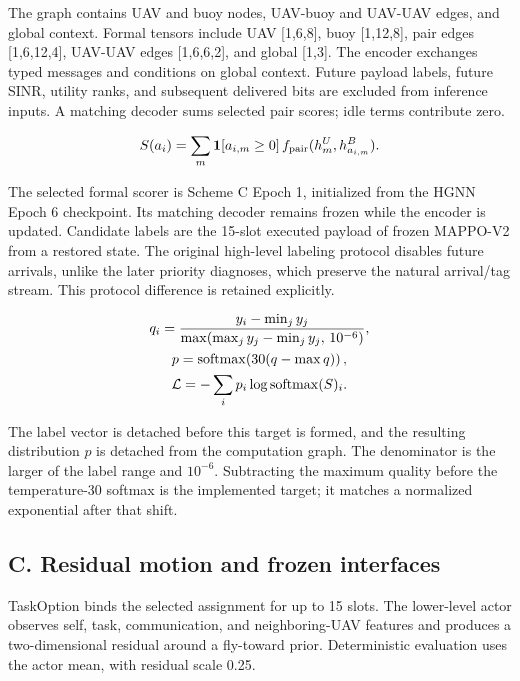 The graph contains UAV and buoy nodes, UAV-buoy and UAV-UAV edges, and global context. Formal tensors include UAV [1,6,8], buoy [1,12,8], pair edges [1,6,12,4], UAV-UAV edges [1,6,6,2], and global [1,3]. The encoder exchanges typed messages and conditions on global context. Future payload labels, future SINR, utility ranks, and subsequent delivered bits are excluded from inference inputs. A matching decoder sums selected pair scores; idle terms contribute zero.

\begin{equation*}
\begin{gathered}
S(a_i)=\sum_m {\bf1}[a_{i,m}\ge0]\, f_{\rm pair}(h_m^U,h_{a_{i,m}}^B).
\end{gathered}
\end{equation*}

The selected formal scorer is Scheme C Epoch 1, initialized from the HGNN Epoch 6 checkpoint. Its matching decoder remains frozen while the encoder is updated. Candidate labels are the 15-slot executed payload of frozen MAPPO-V2 from a restored state. The original high-level labeling protocol disables future arrivals, unlike the later priority diagnoses, which preserve the natural arrival/tag stream. This protocol difference is retained explicitly.

\begin{equation*}
\begin{gathered}
q_i={y_i-\min_j y_j\over \max(\max_j y_j-\min_j y_j,\,10^{-6})},\\
p=\operatorname{softmax}\!\left(30(q-\max q)\right),\\
{\cal L}=-\sum_i p_i\log\operatorname{softmax}(S)_i.
\end{gathered}
\end{equation*}

The label vector is detached before this target is formed, and the resulting distribution $p$ is detached from the computation graph. The denominator is the larger of the label range and $10^{-6}$. Subtracting the maximum quality before the temperature-30 softmax is the implemented target; it matches a normalized exponential after that shift.

\subsection*{C. Residual motion and frozen interfaces}

TaskOption binds the selected assignment for up to 15 slots. The lower-level actor observes self, task, communication, and neighboring-UAV features and produces a two-dimensional residual around a fly-toward prior. Deterministic evaluation uses the actor mean, with residual scale 0.25.

